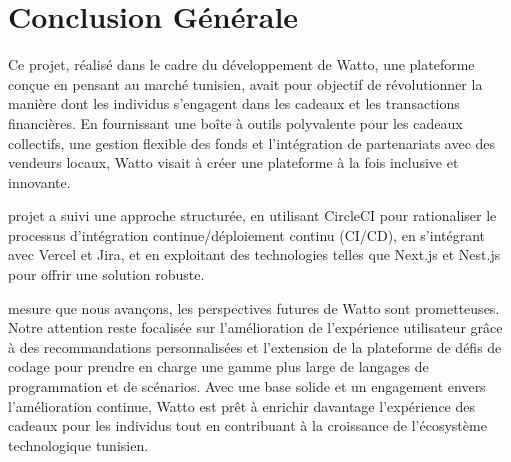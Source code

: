 \documentclass[../main.tex]{subfiles}
\begin{document}
\newpage
\section*{Conclusion Générale}

Ce projet, réalisé dans le cadre du développement de Watto, une plateforme conçue en pensant au marché tunisien, avait pour objectif de révolutionner la manière dont les individus s'engagent dans les cadeaux et les transactions financières. En fournissant une boîte à outils polyvalente pour les cadeaux collectifs, une gestion flexible des fonds et l'intégration de partenariats avec des vendeurs locaux, Watto visait à créer une plateforme à la fois inclusive et innovante.

\vspace{10pt}
\newlineLe projet a suivi une approche structurée, en utilisant CircleCI pour rationaliser le processus d'intégration continue/déploiement continu (CI/CD), en s'intégrant avec Vercel et Jira, et en exploitant des technologies telles que Next.js et Nest.js pour offrir une solution robuste.

\vspace{10pt}
 mesure que nous avançons, les perspectives futures de Watto sont prometteuses. Notre attention reste focalisée sur l'amélioration de l'expérience utilisateur grâce à des recommandations personnalisées et l'extension de la plateforme de défis de codage pour prendre en charge une gamme plus large de langages de programmation et de scénarios. Avec une base solide et un engagement envers l'amélioration continue, Watto est prêt à enrichir davantage l'expérience des cadeaux pour les individus tout en contribuant à la croissance de l'écosystème technologique tunisien.
\end{document}
